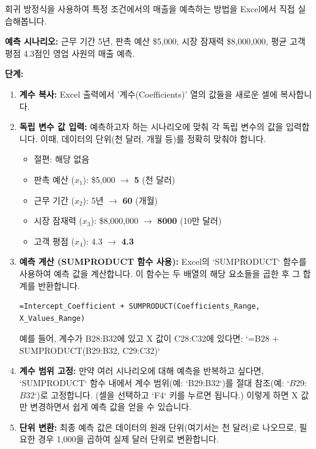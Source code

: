 \documentclass[11pt,a4paper]{article}
\begin{document}
\newpage
\begin{tcolorbox}[title=\textbf{Excel을 이용한 예측 수행}]
회귀 방정식을 사용하여 특정 조건에서의 매출을 예측하는 방법을 Excel에서 직접 실습해봅니다.

\textbf{예측 시나리오:}
근무 기간 5년, 판촉 예산 \$5,000, 시장 잠재력 \$8,000,000, 평균 고객 평점 4.3점인 영업 사원의 매출 예측.

\textbf{단계:}
\begin{enumerate}
    \item \textbf{계수 복사:} Excel 출력에서 '계수(Coefficients)' 열의 값들을 새로운 셀에 복사합니다.
    \item \textbf{독립 변수 값 입력:} 예측하고자 하는 시나리오에 맞춰 각 독립 변수의 값을 입력합니다. 이때, 데이터의 단위(천 달러, 개월 등)를 정확히 맞춰야 합니다.
    \begin{itemize}
        \item 절편: 해당 없음
        \item 판촉 예산 ($x_1$): \$5,000 $\rightarrow$ \textbf{5} (천 달러)
        \item 근무 기간 ($x_2$): 5년 $\rightarrow$ \textbf{60} (개월)
        \item 시장 잠재력 ($x_3$): \$8,000,000 $\rightarrow$ \textbf{8000} (10만 달러)
        \item 고객 평점 ($x_4$): 4.3 $\rightarrow$ \textbf{4.3}
    \end{itemize}
    \item \textbf{예측 계산 (SUMPRODUCT 함수 사용):} Excel의 `SUMPRODUCT` 함수를 사용하여 예측 값을 계산합니다. 이 함수는 두 배열의 해당 요소들을 곱한 후 그 합계를 반환합니다.
    \begin{lstlisting}[language=Excel, caption=SUMPRODUCT 함수를 이용한 예측]
=Intercept_Coefficient + SUMPRODUCT(Coefficients_Range, X_Values_Range)
    \end{lstlisting}
    예를 들어, 계수가 B28:B32에 있고 X 값이 C28:C32에 있다면:
    `=B28 + SUMPRODUCT(B29:B32, C29:C32)`
    \item \textbf{계수 범위 고정:} 만약 여러 시나리오에 대해 예측을 반복하고 싶다면, `SUMPRODUCT` 함수 내에서 계수 범위(예: `B29:B32`)를 절대 참조(예: `$B$29:$B$32`)로 고정합니다. (셀을 선택하고 `F4` 키를 누르면 됩니다.) 이렇게 하면 X 값만 변경하면서 쉽게 예측 값을 얻을 수 있습니다.
    \item \textbf{단위 변환:} 최종 예측 값은 데이터의 원래 단위(여기서는 천 달러)로 나오므로, 필요한 경우 1,000을 곱하여 실제 달러 단위로 변환합니다.
\end{enumerate}


\end{tcolorbox}
\end{document}
